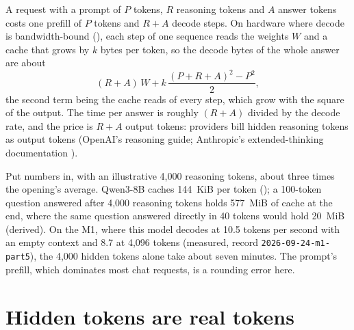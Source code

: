 

A request with a prompt of $P$ tokens, $R$ reasoning tokens and $A$ answer
tokens costs one prefill of $P$ tokens and $R + A$ decode steps. On hardware
where decode is bandwidth-bound (), each step of one sequence
reads the weights $W$ and a cache that grows by $k$ bytes per token, so the
decode bytes of the whole answer are about
\begin{equation}
(R + A)\,W + k\,\frac{(P + R + A)^{2} - P^{2}}{2},
\label{eq:answer-bytes}
\end{equation}
the second term being the cache reads of every step, which grow with the
square of the output. The time per answer is roughly $(R+A)$ divided by the
decode rate, and the price is $R + A$ output tokens: providers bill hidden
reasoning tokens as output tokens (OpenAI's reasoning guide; Anthropic's
extended-thinking documentation \cite{openai2026reasoning,anthropic2026thinking}).

Put numbers in, with an illustrative 4,000 reasoning tokens, about three
times the opening's average. Qwen3-8B caches 144~KiB per token
(); a 100-token question answered after 4,000 reasoning
tokens holds 577~MiB of cache
at the end, where the same question answered directly in 40 tokens would hold
20~MiB (derived). On the M1, where this model decodes at 10.5 tokens per second with
an empty context and 8.7 at 4,096 tokens (measured, record
\texttt{2026-09-24-m1-part5}), the 4,000 hidden tokens alone take about seven
minutes. The prompt's prefill, which dominates most chat requests, is a rounding
error here.

\section{Hidden tokens are real tokens}

